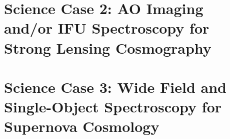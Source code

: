 \documentclass[12pt]{report}
\begin{document}



\section{Science Case 2: AO Imaging and/or IFU Spectroscopy for Strong Lensing Cosmography}



\section{Science Case 3: Wide Field and Single-Object Spectroscopy for Supernova Cosmology}






%


%


%
%


\end{document}
